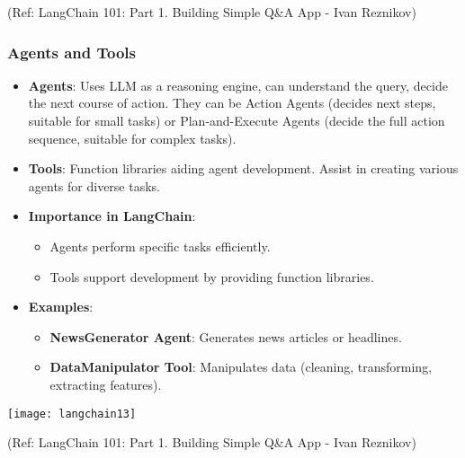 \begin{frame}[fragile]
			{\tiny (Ref: LangChain 101: Part 1. Building Simple Q\&A App - Ivan Reznikov)}
			
		

\end{frame}

\begin{frame}[fragile]\frametitle{Agents and Tools}

      \begin{itemize}
        \item \textbf{Agents}: Uses LLM as a reasoning engine, can understand the query, decide the next course of action. They can be Action Agents (decides next steps, suitable for small tasks) or Plan-and-Execute Agents (decide the full action sequence, suitable for complex tasks).
        \item \textbf{Tools}: Function libraries aiding agent development. Assist in creating various agents for diverse tasks.
        \item \textbf{Importance in LangChain}:
          \begin{itemize}
            \item Agents perform specific tasks efficiently.
            \item Tools support development by providing function libraries.
          \end{itemize}
        \item \textbf{Examples}:
          \begin{itemize}
            \item \textbf{NewsGenerator Agent}: Generates news articles or headlines.
            \item \textbf{DataManipulator Tool}: Manipulates data (cleaning, transforming, extracting features).
          \end{itemize}
      \end{itemize}		  
			\begin{center}
			\texttt{[image: langchain13]}
			\end{center}	  


			{\tiny (Ref: LangChain 101: Part 1. Building Simple Q\&A App - Ivan Reznikov)}
			
		

\end{frame}

